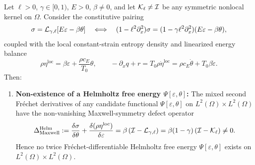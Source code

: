 \begin{theorem}\label{thm:no_free_energy}
Let $\ell > 0$, $\gamma \in [0,1)$, $E > 0$, $\beta \neq 0$, and let $\mathcal{K}_\ell \neq \mathcal{I}$ be any symmetric nonlocal kernel on $\Omega$. Consider the constitutive pairing
\begin{equation}\label{eq:thm1_stress}
  \sigma = \mathcal{L}_{\gamma,\ell}[E\varepsilon - \beta\theta] \quad \Longleftrightarrow \quad (1 - \ell^2\partial_x^2)\sigma = (1 - \gamma\ell^2\partial_x^2)(E\varepsilon - \beta\theta),
\end{equation}
coupled with the local constant-strain entropy density and linearized energy balance
\begin{equation}\label{eq:thm1_entropy}
  \rho\eta^{\mathrm{loc}} = \beta\varepsilon + \frac{\rho c_E}{T_0}\theta, \qquad
  -\partial_x q + r = T_0\rho\dot{\eta}^{\mathrm{loc}} = \rho c_E\dot{\theta} + T_0\beta\dot{\varepsilon}.
\end{equation}
Then:
\begin{enumerate}[label=(\alph*),leftmargin=*]
  \item \textbf{Non-existence of a Helmholtz free energy $\Psi[\varepsilon,\theta]$:} The mixed second Fr{\'e}chet derivatives of any candidate functional $\Psi[\varepsilon,\theta]$ on $L^2(\Omega)\times L^2(\Omega)$ have the non-vanishing Maxwell-symmetry defect operator
  \begin{equation}\label{eq:maxwell_defect_operator}
    \Delta_{\mathrm{Maxwell}}^{\mathrm{Helm}} := \frac{\delta\sigma}{\delta\theta} + \frac{\delta(\rho\eta^{\mathrm{loc}})}{\delta\varepsilon} = \beta\left(\mathcal{I} - \mathcal{L}_{\gamma,\ell}\right) = \beta(1-\gamma)\left(\mathcal{I} - \mathcal{K}_\ell\right) \neq 0.
  \end{equation}
  Hence no twice Fr{\'e}chet-differentiable Helmholtz free energy $\Psi[\varepsilon,\theta]$ exists on $L^2(\Omega)\times L^2(\Omega)$.


\end{enumerate}
\end{theorem}
